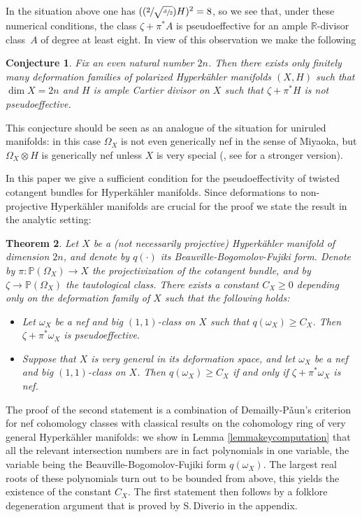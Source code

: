 \documentclass[11pt]{article}
\newcommand{\Psfrac}[2]{(\sfrac{#1}{#2})}
\theoremstyle{plain}
\newtheorem{theorem}{Theorem}[section]
\newtheorem{conjecture}[theorem]{Conjecture}
\theoremstyle{definition}
\newcommand{\R}{\ensuremath{\mathbb{R}}}
\newcommand{\PP}{\ensuremath{\mathbb{P}}}
\newcommand{\holom}[3]{\ensuremath{#1:#2\to #3}}
\begin{document}
In the situation above one has $(\Psfrac{2}{\sqrt{\sfrac{d}{2}}}H)^2 = 8$, so we see that, under these numerical conditions, the class $\zeta+\pi^* A$
is pseudoeffective for an ample $\R$-divisor class~$A$ of degree at least eight.
In view of this observation we make the following

\begin{conjecture} \label{conjecturegeneral}
Fix an even natural number $2n$. Then there exists only
finitely many deformation families of polarized Hyperkähler manifolds $(X, H)$ such that $\dim X=2n$ and
$H$ is ample Cartier divisor on $X$ such that $\zeta + \pi^* H$ is not pseudoeffective.
\end{conjecture}

This conjecture should be seen as an analogue of the situation for uniruled manifolds: in this case $\Omega_X$
is not even generically nef in the sense of Miyaoka, but $\Omega_X \otimes H$ is
generically nef unless $X$ is very special (\cite[Th.\,1.1]{Hoe14}, see \cite[Cor.\,1.3]{AD17} for a stronger version).

In this paper we give a sufficient condition for the pseudoeffectivity of twisted cotangent bundles
for Hyperkähler manifolds. Since deformations to non-projective Hyperkähler manifolds
are crucial for the proof we state the result in the analytic setting:

\begin{theorem}\label{theoremmain}
Let $X$ be a (not necessarily projective) Hyperkähler manifold of dimension $2n$,
and denote by $q(\cdot)$ its Beauville-Bogomolov-Fujiki form.
Denote by $\holom{\pi}{\PP(\Omega_X)}{X}$ the projectivization of the cotangent bundle, and by $\zeta \to \PP(\Omega_X)$ the tautological class.
There exists a constant $C_X \geq 0$ depending only on the deformation family of $X$ such that
the following holds:
\begin{itemize}
\item Let $\omega_X$ be a nef and big $(1,1)$-class on $X$ such that $q(\omega_X) \geq C_X$.
Then $\zeta+\pi^*\omega_X$ is pseudoeffective.
\item Suppose that $X$ is very general in its deformation space, and let
$\omega_X$ be a nef and big $(1,1)$-class on $X$.
Then $q(\omega_X) \geq C_X$ if and only if $\zeta+\pi^*\omega_X$ is nef.
\end{itemize}
\end{theorem}

The proof of the second statement is a combination of Demailly-P\v aun's criterion for nef cohomology classes with
classical results on the cohomology ring of very general Hyperkähler manifolds: we show in Lemma \ref{lemmakeycomputation} that all the relevant intersection numbers are in fact polynomials in one variable,
the variable being the Beauville-Bogomolov-Fujiki form $q(\omega_X)$. The largest real roots of these polynomials turn out to be bounded from above, this yields the existence of the constant $C_X$. The first statement then follows by a folklore
degeneration argument that is proved by S.\,Diverio in the appendix.
\end{document}
